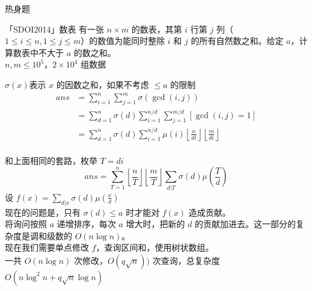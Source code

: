 \documentclass[UTF8]{beamer}
\begin{document}
	\begin{frame}{热身题}
		\begin{block}{「SDOI2014」数表}
			有一张 $n\times m$ 的数表，其第 $i$ 行第 $j$ 列（$1\le i\le n,1\le j\le m$）的数值为能同时整除 $i$ 和 $j$ 的所有自然数之和。给定 $a$，计算数表中不大于 $a$ 的数之和。\\
			$n,m\le 10^5$，$2\times 10^4$ 组数据
		\end{block}
        \pause
		$\sigma(x)$表示 $x$ 的因数之和，如果不考虑 $\le a$ 的限制
		$$
		\begin{aligned}
		ans&=\sum_{i=1}^n\sum_{j=1}^m\sigma(\gcd(i,j))\\
        &=\sum_{d=1}^{n}\sigma(d)\sum_{i=1}^{n/d}\sum_{j=1}^{m/d}[\gcd(i,j)=1]\\
		&=\sum_{d=1}^{n}\sigma(d)\sum_{i=1}^{n/d}\mu(i)\left\lfloor\frac{n}{di}\right\rfloor\left\lfloor\frac{m}{di}\right\rfloor\\
		\end{aligned}
		$$
		
	\end{frame}
	\begin{frame}
        和上面相同的套路，枚举 $T=di$
		$$
		ans=\sum_{T=1}^n\left\lfloor\frac{n}{T}\right\rfloor\left\lfloor\frac{m}{T}\right\rfloor\sum_{d|T}\sigma(d)\mu(\frac{T}{d})
		$$
        \pause
		设 $f(x)=\sum_{d|x}\sigma(d)\mu(\frac{x}{d})$\\
		现在的问题是，只有 $\sigma(d)\le a$ 时才能对 $f(x)$ 造成贡献。\\
		将询问按照 $a$ 递增排序，每次 $a$ 增大时，把新的 $d$ 的贡献加进去。这一部分的复杂度是调和级数的 $O(n\log n)$。\\
		\pause
		现在我们需要单点修改 $f$，查询区间和，使用树状数组。\\
		一共 $O(n\log n)$ 次修改，$O(q\sqrt{n}))$ 次查询，总复杂度 $O(n\log^2 n+q\sqrt{n}\log n)$
	\end{frame}
\end{document}
